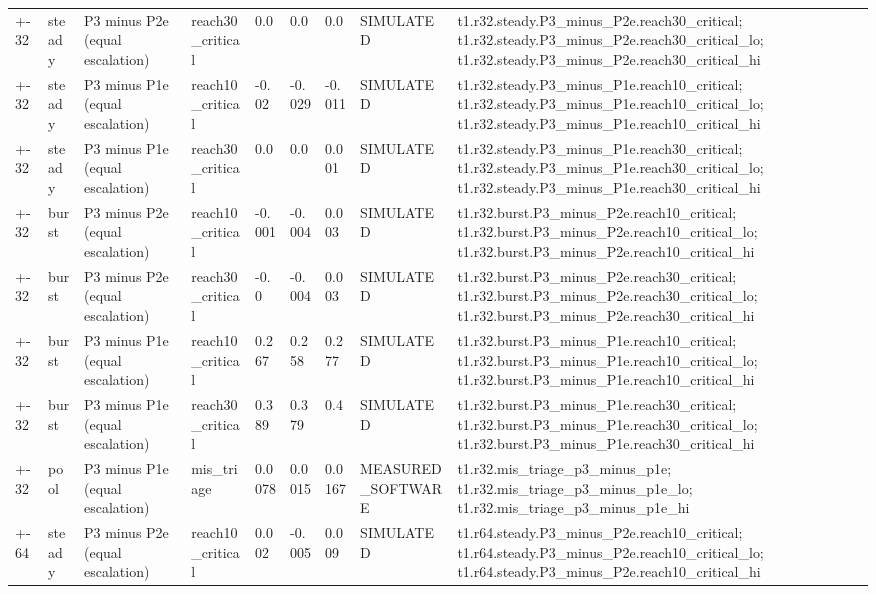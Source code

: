 \begin{table}[t]
\begin{tabular}{lllllllll}
+-32 & steady & P3 minus P2e (equal escalation) & reach30\_critical & 0.0 & 0.0 & 0.0 & SIMULATED & t1.r32.steady.P3\_minus\_P2e.reach30\_critical; t1.r32.steady.P3\_minus\_P2e.reach30\_critical\_lo; t1.r32.steady.P3\_minus\_P2e.reach30\_critical\_hi \\
+-32 & steady & P3 minus P1e (equal escalation) & reach10\_critical & -0.02 & -0.029 & -0.011 & SIMULATED & t1.r32.steady.P3\_minus\_P1e.reach10\_critical; t1.r32.steady.P3\_minus\_P1e.reach10\_critical\_lo; t1.r32.steady.P3\_minus\_P1e.reach10\_critical\_hi \\
+-32 & steady & P3 minus P1e (equal escalation) & reach30\_critical & 0.0 & 0.0 & 0.001 & SIMULATED & t1.r32.steady.P3\_minus\_P1e.reach30\_critical; t1.r32.steady.P3\_minus\_P1e.reach30\_critical\_lo; t1.r32.steady.P3\_minus\_P1e.reach30\_critical\_hi \\
+-32 & burst & P3 minus P2e (equal escalation) & reach10\_critical & -0.001 & -0.004 & 0.003 & SIMULATED & t1.r32.burst.P3\_minus\_P2e.reach10\_critical; t1.r32.burst.P3\_minus\_P2e.reach10\_critical\_lo; t1.r32.burst.P3\_minus\_P2e.reach10\_critical\_hi \\
+-32 & burst & P3 minus P2e (equal escalation) & reach30\_critical & -0.0 & -0.004 & 0.003 & SIMULATED & t1.r32.burst.P3\_minus\_P2e.reach30\_critical; t1.r32.burst.P3\_minus\_P2e.reach30\_critical\_lo; t1.r32.burst.P3\_minus\_P2e.reach30\_critical\_hi \\
+-32 & burst & P3 minus P1e (equal escalation) & reach10\_critical & 0.267 & 0.258 & 0.277 & SIMULATED & t1.r32.burst.P3\_minus\_P1e.reach10\_critical; t1.r32.burst.P3\_minus\_P1e.reach10\_critical\_lo; t1.r32.burst.P3\_minus\_P1e.reach10\_critical\_hi \\
+-32 & burst & P3 minus P1e (equal escalation) & reach30\_critical & 0.389 & 0.379 & 0.4 & SIMULATED & t1.r32.burst.P3\_minus\_P1e.reach30\_critical; t1.r32.burst.P3\_minus\_P1e.reach30\_critical\_lo; t1.r32.burst.P3\_minus\_P1e.reach30\_critical\_hi \\
+-32 & pool & P3 minus P1e (equal escalation) & mis\_triage & 0.0078 & 0.0015 & 0.0167 & MEASURED\_SOFTWARE & t1.r32.mis\_triage\_p3\_minus\_p1e; t1.r32.mis\_triage\_p3\_minus\_p1e\_lo; t1.r32.mis\_triage\_p3\_minus\_p1e\_hi \\
+-64 & steady & P3 minus P2e (equal escalation) & reach10\_critical & 0.002 & -0.005 & 0.009 & SIMULATED & t1.r64.steady.P3\_minus\_P2e.reach10\_critical; t1.r64.steady.P3\_minus\_P2e.reach10\_critical\_lo; t1.r64.steady.P3\_minus\_P2e.reach10\_critical\_hi \\

\end{tabular}
\end{table}
